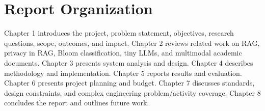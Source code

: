 \section{Report Organization}

Chapter 1 introduces the project, problem statement, objectives, research questions, scope, outcomes, and impact. Chapter 2 reviews related work on RAG, privacy in RAG, Bloom classification, tiny LLMs, and multimodal academic documents. Chapter 3 presents system analysis and design. Chapter 4 describes methodology and implementation. Chapter 5 reports results and evaluation. Chapter 6 presents project planning and budget. Chapter 7 discusses standards, design constraints, and complex engineering problem/activity coverage. Chapter 8 concludes the report and outlines future work.
